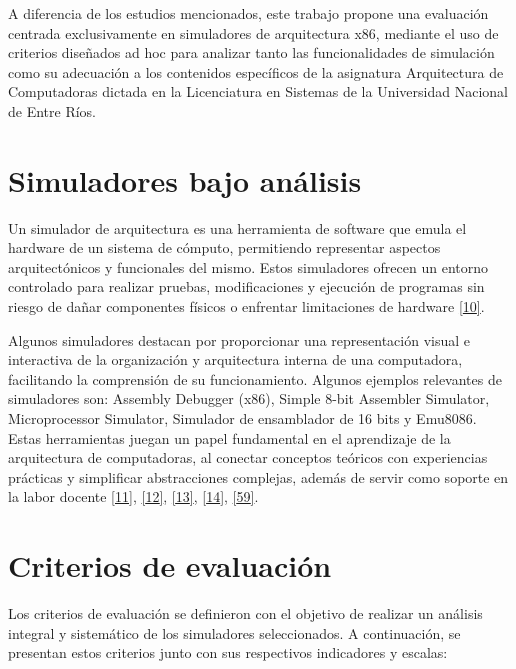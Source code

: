 \documentclass[12pt,oneside]{templates/unerthesis}
\begin{document}
A diferencia de los estudios mencionados, este trabajo propone una evaluación centrada exclusivamente en simuladores de arquitectura x86, mediante el uso de criterios diseñados ad hoc para analizar tanto las funcionalidades de simulación como su adecuación a los contenidos específicos de la asignatura Arquitectura de Computadoras dictada en la Licenciatura en Sistemas de la Universidad Nacional de Entre Ríos.

\hypertarget{simuladores-bajo-anuxe1lisis}{%
\section{Simuladores bajo análisis}\label{simuladores-bajo-anuxe1lisis}}

Un simulador de arquitectura es una herramienta de software que emula el hardware de un sistema de cómputo, permitiendo representar aspectos arquitectónicos y funcionales del mismo. Estos simuladores ofrecen un entorno controlado para realizar pruebas, modificaciones y ejecución de programas sin riesgo de dañar componentes físicos o enfrentar limitaciones de hardware \protect\hyperlink{ref-radivojevic_design_2011}{{[}10{]}}.

Algunos simuladores destacan por proporcionar una representación visual e interactiva de la organización y arquitectura interna de una computadora, facilitando la comprensión de su funcionamiento. Algunos ejemplos relevantes de simuladores son: Assembly Debugger (x86), Simple 8-bit Assembler Simulator, Microprocessor Simulator, Simulador de ensamblador de 16 bits y Emu8086. Estas herramientas juegan un papel fundamental en el aprendizaje de la arquitectura de computadoras, al conectar conceptos teóricos con experiencias prácticas y simplificar abstracciones complejas, además de servir como soporte en la labor docente \protect\hyperlink{ref-nikolic_survey_2009}{{[}11{]}}, \protect\hyperlink{ref-hasan_survey_2012}{{[}12{]}}, \protect\hyperlink{ref-hennessy2017computer}{{[}13{]}}, \protect\hyperlink{ref-stallings_computer_2021}{{[}14{]}}, \protect\hyperlink{ref-behrooz_computer_2005}{{[}59{]}}.

\hypertarget{criterios-de-evaluaciuxf3n}{%
\section{Criterios de evaluación}\label{criterios-de-evaluaciuxf3n}}

Los criterios de evaluación se definieron con el objetivo de realizar un análisis integral y sistemático de los simuladores seleccionados. A continuación, se presentan estos criterios junto con sus respectivos indicadores y escalas:
\end{document}
